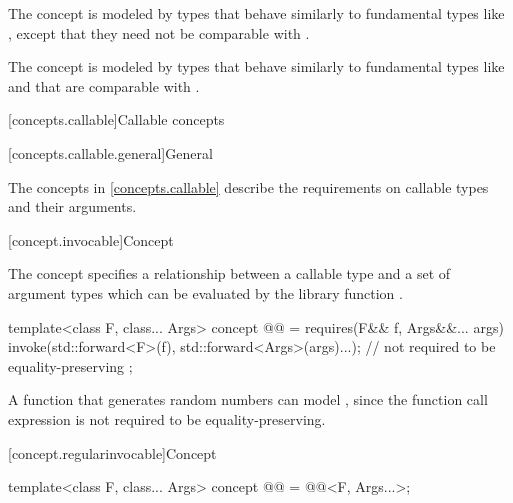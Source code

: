 \begin{itemdescr}
\pnum
\begin{note}
The  concept is modeled by types that behave similarly
to fundamental types like , except that they need not
be comparable with \tcode{==}.
\end{note}

\pnum
\begin{note}
The  concept is modeled by types that behave similarly to
fundamental types like  and that are comparable with
\tcode{==}.
\end{note}
\end{itemdescr}

[concepts.callable]{Callable concepts}

[concepts.callable.general]{General}

\pnum
The concepts in \ref{concepts.callable} describe the requirements on
callable types and their arguments.

[concept.invocable]{Concept }

\pnum
The  concept specifies a relationship between a callable
type  and a set of argument types  which
can be evaluated by the library function .

\begin{itemdecl}
template<class F, class... Args>
  concept @@ = requires(F&& f, Args&&... args) {
    invoke(std::forward<F>(f), std::forward<Args>(args)...); // not required to be equality-preserving
  };
\end{itemdecl}

\begin{itemdescr}
\pnum
\begin{example}
A function that generates random numbers can model ,
since the  function call expression is not required to be
equality-preserving.
\end{example}
\end{itemdescr}

[concept.regularinvocable]{Concept }

\begin{itemdecl}
template<class F, class... Args>
  concept @@ = @@<F, Args...>;
\end{itemdecl}

